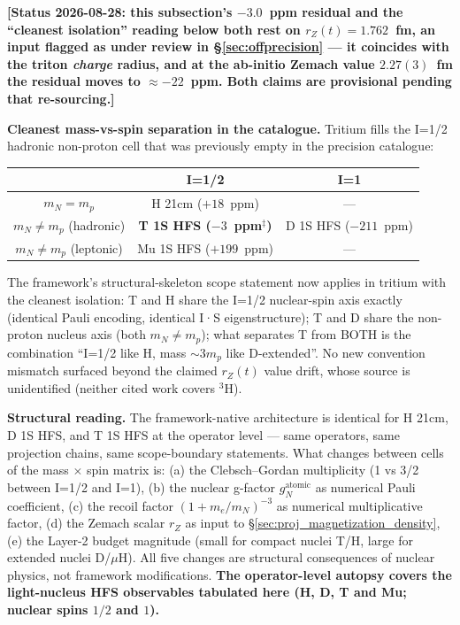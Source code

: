 \documentclass[11pt]{article}
\begin{document}
\textbf{[Status 2026-08-28: this subsection's $-3.0$~ppm residual and the
``cleanest isolation'' reading below both rest on $r_Z(t) = 1.762$~fm,
an input flagged as under review in \S\ref{sec:offprecision} --- it
coincides with the triton \emph{charge} radius, and at the ab-initio
Zemach value $2.27(3)$~fm the residual moves to $\approx -22$~ppm.
Both claims are provisional pending that re-sourcing.]}

\textbf{Cleanest mass-vs-spin separation in the catalogue.}  Tritium
fills the I=1/2 hadronic non-proton cell that was previously empty in
the precision catalogue:

\begin{center}
\small
\begin{tabular}{c|c|c}
& I=1/2 & I=1 \\
\hline
$m_N = m_p$ & H 21cm ($+18$~ppm) & --- \\
$m_N \neq m_p$ (hadronic) & \textbf{T 1S HFS ($-3$~ppm$^{\ddagger}$)} & D 1S HFS ($-211$~ppm) \\
$m_N \neq m_p$ (leptonic) & Mu 1S HFS ($+199$~ppm) & --- \\
\end{tabular}
\end{center}

The framework's structural-skeleton scope statement now applies in
tritium with the cleanest isolation: T and H share the I=1/2
nuclear-spin axis exactly (identical Pauli encoding, identical I·S
eigenstructure); T and D share the non-proton nucleus axis (both
$m_N \neq m_p$); what separates T from BOTH is the combination
``I=1/2 like H, mass $\sim 3 m_p$ like D-extended''.  No new convention mismatch surfaced beyond the
claimed $r_Z(t)$ value drift, whose source is unidentified (neither
cited work covers ${}^3$H).


\textbf{Structural reading.}  The framework-native architecture is
identical for H 21cm, D 1S HFS, and T 1S HFS at the operator level
--- same operators, same projection chains, same scope-boundary
statements.  What changes between cells of the mass $\times$ spin
matrix is:
(a) the Clebsch--Gordan multiplicity (1 vs 3/2 between I=1/2 and I=1),
(b) the nuclear g-factor $g_N^\text{atomic}$ as numerical Pauli
coefficient,
(c) the recoil factor $(1+m_e/m_N)^{-3}$ as numerical multiplicative
factor,
(d) the Zemach scalar $r_Z$ as input to \S\ref{sec:proj_magnetization_density},
(e) the Layer-2 budget magnitude (small for compact nuclei T/H,
large for extended nuclei D/$\mu$H).  All five changes are structural
consequences of nuclear physics, not framework modifications.
\textbf{The operator-level autopsy covers the light-nucleus HFS
observables tabulated here (H, D, T and Mu; nuclear spins $1/2$
and $1$).}
\end{document}
